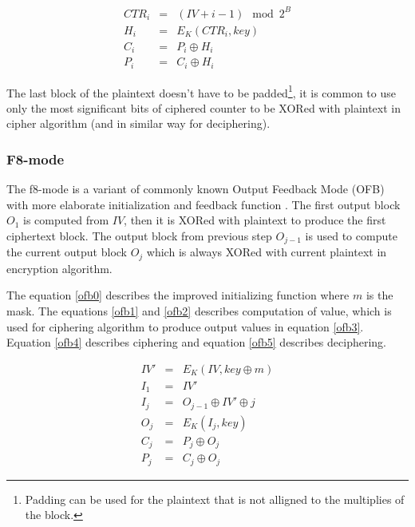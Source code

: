 \begin{eqnarray}
\label{ctr1}
CTR_i &=& (IV + i-1)\mod 2^B \\
\label{ctr2}
H_i &=& E_K(CTR_i, key) \\
\label{ctr3}
C_i &=& P_i \oplus H_i \\
\label{ctr4}
P_i &=& C_i \oplus H_i
\end{eqnarray} 

The last block of the plaintext doesn't have to be padded\footnote{ Padding 
can be used for the plaintext that is not alligned to the multiplies of the 
block.}, it is common to use only the most significant bits of ciphered counter
to be XORed with plaintext in cipher algorithm (and in similar way for
deciphering). 


\subsubsection*{F8-mode}
The f8-mode is a variant of commonly known Output Feedback Mode (OFB)
\cite{blockciphers} with more elaborate initialization and feedback function
\cite{rfc3711}. The first output block $O_1$ is computed from $IV$, then it
is XORed with plaintext to produce the first ciphertext block. The output block
from previous step $O_{j-1}$ is used to compute the current output block $O_j$
which is always XORed with current plaintext in encryption algorithm. 

The equation \ref{ofb0} describes the improved initializing function where
$m$ is the mask. The equations \ref{ofb1} and \ref{ofb2} describes computation 
of value, which is used for ciphering algorithm to produce output values in 
equation \ref{ofb3}. Equation \ref{ofb4} describes ciphering and equation 
\ref{ofb5} describes deciphering.

\begin{eqnarray}
\label{ofb0}
IV' &=& E_K(IV, key \oplus m)\\
\label{ofb1}
I_1 &=& IV' \\
\label{ofb2}
I_j &=& O_{j-1} \oplus IV' \oplus j \\
\label{ofb3}
O_j &=& E_K(I_j, key) \\
\label{ofb4}
C_j &=& P_j \oplus O_j \\
\label{ofb5}
P_j &=& C_j \oplus O_j
\label{}
\end{eqnarray}



